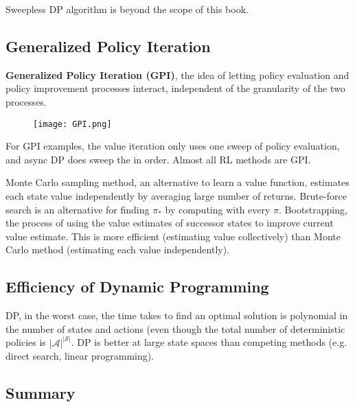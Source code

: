 \documentclass[lang=en,mode=geye,device=normal,color=blue,14pt]{elegantnote}
\DeclareMathOperator*{\1}{\mathbbm{1}}
\begin{document}
Sweepless DP algorithm is beyond the scope of this book.

\subsection{Generalized Policy Iteration}

\begin{definition}
\textbf{Generalized Policy Iteration (GPI)}, the idea of letting policy evaluation and policy improvement processes interact, independent of the granularity of the two processes.
\end{definition}
\begin{figure}[!h]
  \centering
  \texttt{[image: GPI.png]}
  \label{fig:GPI}
\end{figure}

For GPI examples, the value iteration only uses one sweep of policy evaluation, and async DP does sweep the in order. Almost all RL methods are GPI.

Monte Carlo sampling method, an alternative to learn a value function, estimates each state value independently by averaging large number of returns.
Brute-force search is an alternative for finding $\pi_*$ by computing with every $\pi$.
Bootstrapping, the process of using the value estimates of successor states to improve current value estimate. This is more efficient (estimating value collectively) than Monte Carlo method (estimating each value independently).

\subsection{Efficiency of Dynamic Programming}

DP, in the worst case, the time takes to find an optimal solution is polynomial in the number of states and actions (even though the total number of deterministic policies is $|\mathcal{A}|^{|\mathcal{S}|}$. DP is better at large state spaces than competing methods (e.g. direct search, linear programming).

\subsection{Summary}
\end{document}
